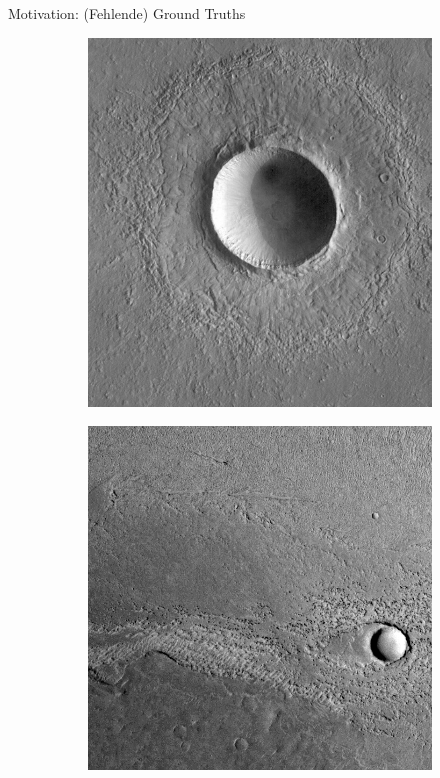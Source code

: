 \documentclass{beamer}
\begin{document}
\begin{frame}{Motivation: (Fehlende) Ground Truths}
\begin{minipage}{0.68\textwidth}
\end{minipage}
\hfill
\begin{minipage}{0.2\textwidth}
	\begin{figure}[h!]
		\begin{subfigure}{\textwidth}
			\includegraphics[width=\textwidth,keepaspectratio]{gfx/Gre13_01.jpg}
		\end{subfigure}
		\begin{subfigure}{\textwidth}
			\includegraphics[width=\textwidth,keepaspectratio]{gfx/p03_02.png}

\end{subfigure}
\end{figure}
\end{minipage}
\end{frame}
\end{document}
